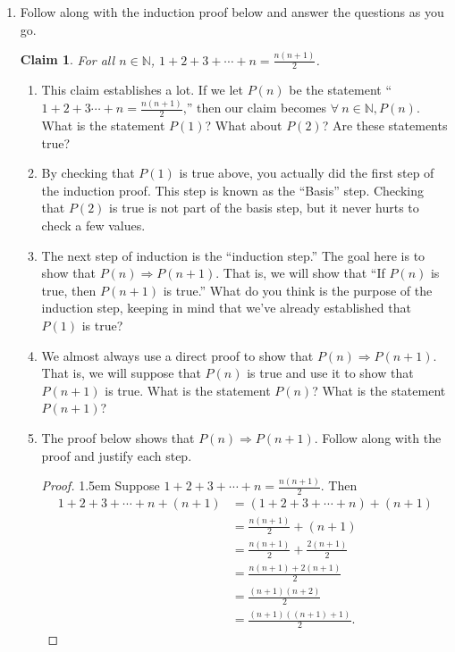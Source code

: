 \documentclass[12 pt]{article}
\newcommand{\N}{\mathbb{N}}
\newcommand{\ds}{\displaystyle}
\theoremstyle{definition}
\theoremstyle{plain}
\theoremstyle{mytheorem}
\newtheorem{claim}{Claim}
\theoremstyle{myexample}
\theoremstyle{mydefinition}
\begin{document}
\begin{enumerate}
\item Follow along with the induction proof below and answer the questions as you go.

\begin{claim}
For all $n\in \N$, $\ds 1+2+3+\cdots+n = \frac{n(n+1)}{2}$.
\end{claim}

\begin{enumerate}
\item This claim establishes a lot.  If we let $P(n)$ be the statement ``$1+2+3\cdots +n = \frac{n(n+1)}{2}$,'' then our claim becomes $\forall \ n\in \N, P(n)$.  What is the statement $P(1)$?  What about $P(2)$?  Are these statements true?
\vspace{1in}
\item By checking that $P(1)$ is true above, you actually did the first step of the induction proof.  This step is known as the ``Basis'' step.  Checking that $P(2)$ is true is not part of the basis step, but it never hurts to check a few values.
\item The next step of induction is the ``induction step.''  The goal here is to show that $P(n) \Rightarrow P(n+1)$.  That is, we will show that ``If $P(n)$ is true, then $P(n+1)$ is true.''  What do you think is the purpose of the induction step, keeping in mind that we've already established that $P(1)$ is true?
\vspace{2in}
\item We almost always use a direct proof to show that $P(n) \Rightarrow P(n+1)$.  That is, we will suppose that $P(n)$ is true and use it to show that $P(n+1)$ is true.  What is the statement $P(n)$?  What is the statement $P(n+1)$?
\vspace{2in}
\item The proof below shows that $P(n) \Rightarrow P(n+1)$.  Follow along with the proof and justify each step.
\begin{proof}
\openup 1.5em Suppose $\ds 1+2+3+\cdots+n= \frac{n(n+1)}{2}$.  Then 
\begin{align*}
1+2+3+\cdots + n + (n+1) &= (1+2+3+\cdots + n)+(n+1)\\
\ &= \frac{n(n+1)}{2} + (n+1) \\
\ &= \frac{n(n+1)}{2} + \frac{2(n+1)}{2}\\
\ &= \frac{n(n+1)+2(n+1)}{2}\\
\ &= \frac{(n+1)(n+2)}{2}\\
\ &= \frac{(n+1)((n+1)+1)}{2}.
\end{align*}

\end{proof}
\end{enumerate}
\end{enumerate}
\end{document}
